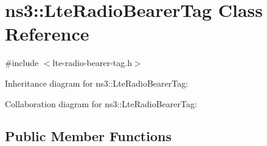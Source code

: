 \hypertarget{classns3_1_1LteRadioBearerTag}{}\section{ns3\+:\+:Lte\+Radio\+Bearer\+Tag Class Reference}
\label{classns3_1_1LteRadioBearerTag}


{\ttfamily \#include $<$lte-\/radio-\/bearer-\/tag.\+h$>$}



Inheritance diagram for ns3\+:\+:Lte\+Radio\+Bearer\+Tag\+:


Collaboration diagram for ns3\+:\+:Lte\+Radio\+Bearer\+Tag\+:
\subsection*{Public Member Functions}
